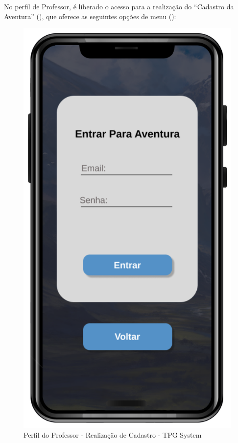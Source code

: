 No perfil de Professor, é liberado o acesso para a realização do “Cadastro da Aventura” (), que oferece as seguintes opções de menu ():
\\
\pagebreak

\begin{figure}[!h]
\centering
\caption{Perfil do Professor - Realização de Cadastro - TPG System}%
\label{fig:Tela4}
\includegraphics[scale=0.20]{Illustrations/Tela4.png}
\end{figure}

